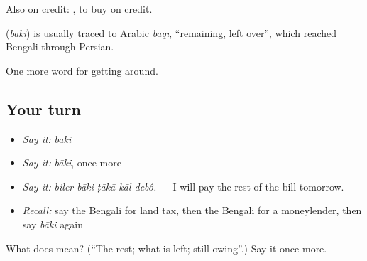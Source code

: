 Also on credit:  , to buy on credit.

\begin{cousinweb}
\textbf{} (\emph{bāki}) is usually traced to Arabic \emph{bāqī}, \textquotedblleft{}remaining, left over\textquotedblright{}, which reached Bengali through Persian.
\end{cousinweb}

\begin{grammarlens}[title={What you've built}]
One more word for getting around.
\end{grammarlens}

\subsection*{Your turn}
\begin{itemize}
\raggedright
  \item \emph{Say it:} \emph{bāki}
  \item \emph{Say it:} \emph{bāki}, once more
  \item \emph{Say it:} \emph{biler bāki ṭākā kāl debô.} — I will pay the rest of the bill tomorrow.
  \item \emph{Recall:} say the Bengali for land tax, then the Bengali for a moneylender, then say \emph{bāki} again
\end{itemize}

\begin{tcolorbox}[breakable,colback=teal!4,colframe=teal!35!black,title={Before you move on}]
What does  mean? (\textquotedblleft{}The rest; what is left; still owing\textquotedblright{}.) Say it once more.
\end{tcolorbox}
